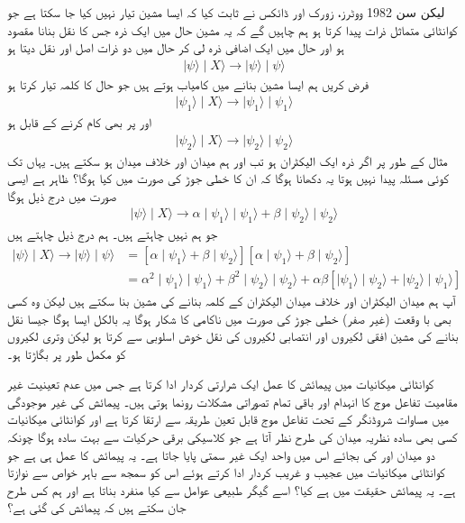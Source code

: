 لیکن سن \num{1982} ووٹرز، زورک اور ڈائکس نے ثابت کیا کہ ایسا مشین تیار نہیں کیا جا سکتا ہے جو کوانٹائی متماثل ذرات پیدا کرتا ہو ہم چاہیں گے کہ یہ مشین حال  میں ایک ذرہ جس کا نقل بنانا مقصود ہو اور حال  میں ایک اضافی ذرہ لی کر  حال  میں دو ذرات  اصل اور نقل دیتا ہو 
\begin{align}
	\mid\psi\rangle\mid X\rangle\to\mid\psi\rangle\mid\psi\rangle
\end{align}
فرض کریں ہم ایسا مشین بنانے میں کامیاب ہوتے ہیں جو حال  کا کلمہ تیار کرتا ہو 
\begin{align}
	\mid\psi_1\rangle\mid X\rangle\to\mid\psi_1\rangle\mid\psi_1\rangle
\end{align}
اور  پر بھی کام کرنے کے قابل ہو
\begin{align}
	\mid\psi_2\rangle\mid X\rangle\to\mid\psi_2\rangle\mid\psi_2\rangle
\end{align}
مثال کے طور پر اگر ذرہ ایک الیکٹران ہو تب  اور  ہم میدان اور خلاف میدان ہو سکتے ہیں۔ یہاں تک کوئی مسئلہ پیدا نہیں ہوتا یہ دکھانا ہوگا کہ ان کا خطی جوڑ  کی صورت میں کیا ہوگا؟ ظاہر ہے ایسی صورت میں درج ذیل ہوگا
\begin{align}
	\mid\psi\rangle\mid X\rangle\to\alpha\mid\psi_1\rangle\mid\psi_1\rangle+\beta\mid\psi_2\rangle\mid\psi_2\rangle
\end{align}
جو ہم نہیں چاہتے ہیں۔ ہم درج ذیل چاہتے ہیں  
\begin{align}
	\mid\psi\rangle\mid X\rangle\to\mid\psi\rangle\mid\psi\rangle &= [\alpha\mid\psi_1\rangle+\beta\mid\psi_2\rangle][\alpha\mid\psi_1\rangle+\beta\mid\psi_2\rangle]\nonumber \\
	&= \alpha^2\mid\psi_1\rangle\mid\psi_1\rangle+\beta^2\mid\psi_2\rangle\mid\psi_2\rangle+\alpha\beta[\mid\psi_1\rangle\mid\psi_2\rangle+\mid\psi_2\rangle\mid\psi_1\rangle]
\end{align}
آپ ہم میدان الیکٹران اور خلاف میدان الیکٹران کے کلمہ بنانے کی مشین بنا سکتے ہیں لیکن وہ کسی بھی با وقعت (غیر صفر)  خطی جوڑ کی صورت میں ناکامی کا شکار ہوگا یہ بالکل ایسا ہوگا جیسا نقل بنانے کی مشین  افقی لکیروں اور انتصابی لکیروں کی نقل خوش اسلوبی سے کرتا ہو لیکن وتری لکیروں کو مکمل طور پر بگاڑتا ہو۔

کوانٹائی میکانیات میں پیمائش کا عمل ایک شرارتی کردار ادا کرتا ہے جس میں عدم تعینیت غیر مقامیت تفاعل موج کا انہدام اور باقی تمام تصوراتی مشکلات رونما ہوتی ہیں۔ پیمائش کی غیر موجودگی میں مساوات شروڈنگر کے تحت تفاعل موج قابل تعین طریقہ سے ارتقا کرتا ہے اور کوانٹائی میکانیات کسی بھی سادہ نظریہ میدان کی طرح نظر آتا ہے جو کلاسیکی برقی حرکیات سے بہت سادہ ہوگا چونکہ دو میدان  اور  کی بجائے اس میں واحد ایک غیر سمتی  پایا جاتا ہے۔ یہ پیمائش کا عمل ہی ہے جو کوانٹائی میکانیات میں عجیب و غریب کردار ادا کرتے ہوئے اس کو سمجھ سے باہر خواص سے نوازتا ہے۔ یہ پیمائش حقیقت میں ہے کیا؟ اسے گیگر طبیعی عوامل سے کیا منفرد بناتا ہے اور ہم کس طرح جان سکتے ہیں کہ پیمائش کی گئی ہے؟

